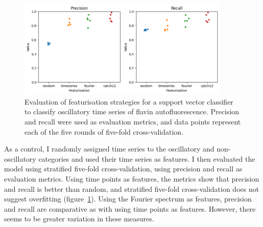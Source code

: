 \begin{figure}
  \centering
  \includegraphics[width=0.9\textwidth]{precision_recall}
  \caption{
    Evaluation of featurisation strategies for a support vector classifier to classify oscillatory time series of flavin autofluorescence.
    Precision and recall were used as evaluation metrics, and data points represent each of the five rounds of five-fold cross-validation.
  }
  \label{fig:analysis-precision-recall}
\end{figure}

As a control, I randomly assigned time series to the oscillatory and non-oscillatory categories and used their time series as features.
I then evaluated the model using stratified five-fold cross-validation, using precision and recall as evaluation metrics.
Using time points as features, the metrics show that precision and recall is better than random, and stratified five-fold cross-validation does not suggest overfitting (figure~\ref{fig:analysis-precision-recall}).
Using the Fourier spectrum as features, precision and recall are comparative as with using time points as
features.
However, there seems to be greater variation in these measures.

